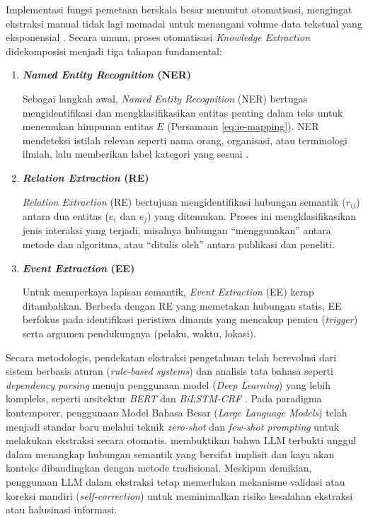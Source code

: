 Implementasi fungsi pemetaan berskala besar menuntut otomatisasi, mengingat ekstraksi manual tidak lagi memadai untuk menangani volume data tekstual yang eksponensial \citep{Premasiri2025}. Secara umum, proses otomatisasi \textit{Knowledge Extraction} didekomposisi menjadi tiga tahapan fundamental:

\begin{enumerate}[label=\textbf{\arabic*.}, leftmargin=*, itemsep=10pt]
    \item \textbf{\textit{Named Entity Recognition} (NER)}

          \hspace*{0.75cm} Sebagai langkah awal, \textit{Named Entity Recognition} (NER) bertugas mengidentifikasi dan mengklasifikasikan entitas penting dalam teks untuk menemukan himpunan entitas \(E\) (Persamaan \ref{eq:ie-mapping}). NER mendeteksi istilah relevan seperti nama orang, organisasi, atau terminologi ilmiah, lalu memberikan label kategori yang sesuai \cite{ZHAO2023225}.

    \item \textbf{\textit{Relation Extraction} (RE)}

          \hspace*{0.75cm} \textit{Relation Extraction} (RE) bertujuan mengidentifikasi hubungan semantik (\(r_{ij}\)) antara dua entitas (\(e_i\) dan \(e_j\)) yang ditemukan. Proses ini mengklasifikasikan jenis interaksi yang terjadi, misalnya hubungan ``menggunakan'' antara metode dan algoritma, atau ``ditulis oleh'' antara publikasi dan peneliti.

    \item \textbf{\textit{Event Extraction} (EE)}

          \hspace*{0.75cm} Untuk memperkaya lapisan semantik, \textit{Event Extraction} (EE) kerap ditambahkan. Berbeda dengan RE yang memetakan hubungan statis, EE berfokus pada identifikasi peristiwa dinamis yang mencakup pemicu (\textit{trigger}) serta argumen pendukungnya (pelaku, waktu, lokasi).

\end{enumerate}

Secara metodologis, pendekatan ekstraksi pengetahuan telah berevolusi dari sistem berbasis aturan (\textit{rule-based systems}) dan analisis tata bahasa seperti \textit{dependency parsing} menuju penggunaan model (\textit{Deep Learning}) yang lebih kompleks, seperti arsitektur \textit{BERT} dan \textit{BiLSTM-CRF} \citep{han2025ragvsgraphragsystematic}. Pada paradigma kontemporer, penggunaan Model Bahasa Besar (\textit{Large Language Models}) telah menjadi standar baru melalui teknik \textit{ zero-shot} dan \textit{few-shot prompting} untuk melakukan ekstraksi secara otomatis. \citep{sanmartin2024kgragbridginggapknowledge} membuktikan bahwa LLM terbukti unggul dalam menangkap hubungan semantik yang bersifat implisit dan kaya akan konteks dibandingkan dengan metode tradisional. Meskipun demikian, penggunaan LLM dalam ekstraksi tetap memerlukan mekanisme validasi atau koreksi mandiri (\textit{self-correction}) untuk meminimalkan risiko kesalahan ekstraksi atau halusinasi informasi.

